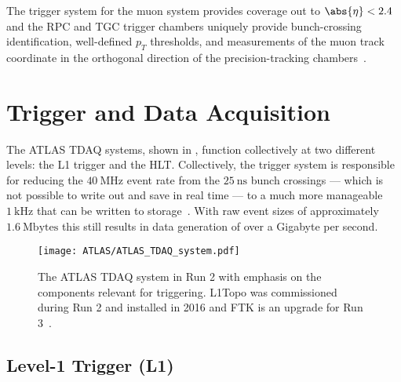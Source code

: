 The trigger system for the muon system provides coverage out to $\abs{\eta} < 2.4$ and the \gls{RPC} and \gls{TGC} trigger chambers uniquely provide bunch-crossing identification, well-defined $p_{T}$ thresholds, and measurements of the muon track coordinate in the orthogonal direction of the precision-tracking chambers~\cite{PERF-2007-01}.

\section{Trigger and Data Acquisition}\label{sec:ATLAS_TDAQ}

The ATLAS \gls{TDAQ} systems, shown in , function collectively at two different levels: the L1 trigger and the \gls{HLT}.
Collectively, the trigger system is responsible for reducing the $40~\mathrm{MHz}$ event rate from the $25~\mathrm{ns}$ bunch crossings --- which is not possible to write out and save in real time --- to a much more manageable $1~\mathrm{kHz}$ that can be written to storage~\cite{TRIG-2016-01}.
With raw event sizes of approximately $1.6~\mathrm{Mbytes}$ this still results in data generation of over a Gigabyte per second.

\begin{figure}[htbp]
 \centering
 \texttt{[image: ATLAS/ATLAS\_TDAQ\_system.pdf]}
 \caption[The ATLAS \gls{TDAQ} system in Run 2 with emphasis on the components relevant for triggering.]{%
  The ATLAS \gls{TDAQ} system in Run 2 with emphasis on the components relevant for triggering.
  L1Topo was commissioned during Run 2 and installed in 2016 and FTK is an upgrade for Run 3~\cite{TRIG-2016-01}.}\label{fig:ATLAS_TDAQ_system}
\end{figure}

\subsection{Level-1 Trigger (L1)}\label{sec:ATLAS_L1_trigger}

